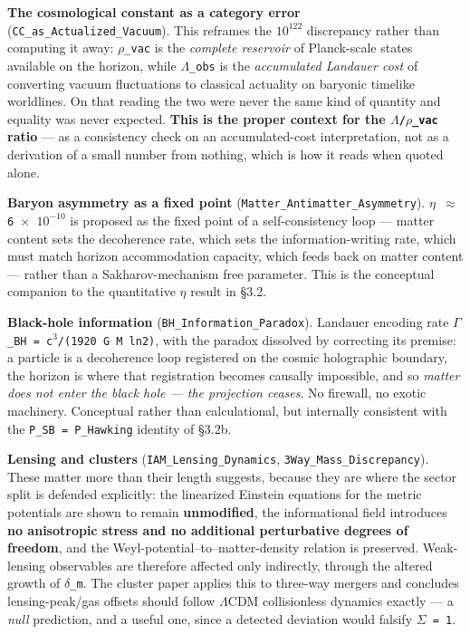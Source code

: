 \documentclass[12pt,a4paper]{article}
\begin{document}
\textbf{The cosmological constant as a category error} (\texttt{CC\_as\_Actualized\_Vacuum}). This reframes the $10^{122}$ discrepancy rather than computing it away: \texttt{$\rho$\_vac} is the \textit{complete reservoir} of Planck-scale states available on the horizon, while \texttt{$\Lambda$\_obs} is the \textit{accumulated Landauer cost} of converting vacuum fluctuations to classical actuality on baryonic timelike worldlines. On that reading the two were never the same kind of quantity and equality was never expected. \textbf{This is the proper context for the \texttt{$\Lambda$/$\rho$\_vac} ratio} --- as a consistency check on an accumulated-cost interpretation, not as a derivation of a small number from nothing, which is how it reads when quoted alone.


\textbf{Baryon asymmetry as a fixed point} (\texttt{Matter\_Antimatter\_Asymmetry}). \texttt{$\eta$ $\approx$ 6 $\times$ $10^{-10}$} is proposed as the fixed point of a self-consistency loop --- matter content sets the decoherence rate, which sets the information-writing rate, which must match horizon accommodation capacity, which feeds back on matter content --- rather than a Sakharov-mechanism free parameter. This is the conceptual companion to the quantitative \texttt{$\eta$} result in \S3.2.


\textbf{Black-hole information} (\texttt{BH\_Information\_Paradox}). Landauer encoding rate \texttt{$\Gamma$\_BH = c$^{3}$/(1920 G M ln2)}, with the paradox dissolved by correcting its premise: a particle is a decoherence loop registered on the cosmic holographic boundary, the horizon is where that registration becomes causally impossible, and so \textit{matter does not enter the black hole --- the projection ceases}. No firewall, no exotic machinery. Conceptual rather than calculational, but internally consistent with the \texttt{P\_SB = P\_Hawking} identity of \S3.2b.


\textbf{Lensing and clusters} (\texttt{IAM\_Lensing\_Dynamics}, \texttt{3Way\_Mass\_Discrepancy}). These matter more than their length suggests, because they are where the sector split is defended explicitly: the linearized Einstein equations for the metric potentials are shown to remain \textbf{unmodified}, the informational field introduces \textbf{no anisotropic stress and no additional perturbative degrees of freedom}, and the Weyl-potential--to--matter-density relation is preserved. Weak-lensing observables are therefore affected only indirectly, through the altered growth of \texttt{$\delta$\_m}. The cluster paper applies this to three-way mergers and concludes lensing-peak/gas offsets should follow $\Lambda$CDM collisionless dynamics exactly --- a \textit{null} prediction, and a useful one, since a detected deviation would falsify \texttt{$\Sigma$ = 1}.
\end{document}
